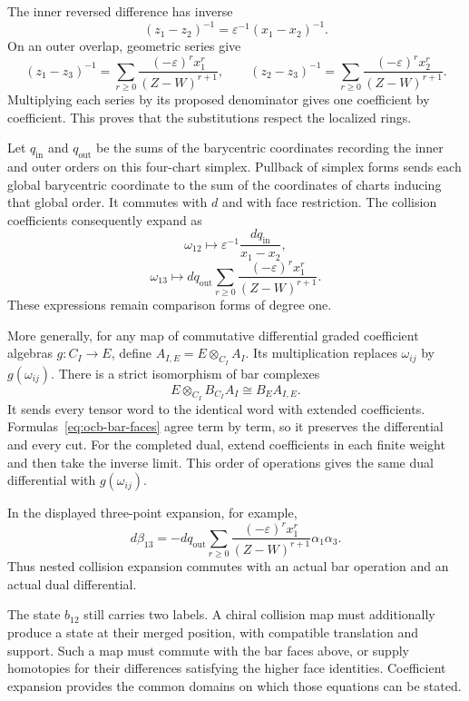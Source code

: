 The inner reversed difference has inverse
\[
 (z_1-z_2)^{-1}
 =\varepsilon^{-1}(x_1-x_2)^{-1}.
\]
On an outer overlap, geometric series give
\[
 (z_1-z_3)^{-1}
 =\sum_{r\ge0}\frac{(-\varepsilon)^r x_1^r}{(Z-W)^{r+1}},
 \qquad
 (z_2-z_3)^{-1}
 =\sum_{r\ge0}\frac{(-\varepsilon)^r x_2^r}{(Z-W)^{r+1}}.
\]
Multiplying each series by its proposed denominator gives one
coefficient by coefficient. This proves that the substitutions
respect the localized rings.

Let $q_{\mathrm{in}}$ and $q_{\mathrm{out}}$ be the sums of the
barycentric coordinates recording the inner and outer orders on
this four-chart simplex. Pullback of simplex forms sends each
global barycentric coordinate to the sum of the coordinates of
charts inducing that global order.
It commutes with $d$ and with face restriction.
The collision coefficients consequently expand as
\[
 \omega_{12}\longmapsto
 \varepsilon^{-1}\frac{dq_{\mathrm{in}}}{x_1-x_2},
\]
\[
 \omega_{13}\longmapsto
 dq_{\mathrm{out}}\sum_{r\ge0}
 \frac{(-\varepsilon)^r x_1^r}{(Z-W)^{r+1}}.
\]
These expressions remain comparison forms of degree one.

More generally, for any map of commutative differential graded
coefficient algebras $g:C_I\to E$, define
$A_{I,E}=E\otimes_{C_I}A_I$.
Its multiplication replaces $\omega_{ij}$ by $g(\omega_{ij})$.
There is a strict isomorphism of bar complexes
\[
 E\otimes_{C_I}B_{C_I}A_I
 \cong B_E A_{I,E}.
\]
It sends every tensor word to the identical word with extended
coefficients. Formulas~\eqref{eq:ocb-bar-faces} agree term by term,
so it preserves the differential and every cut.
For the completed dual, extend coefficients in each finite weight
and then take the inverse limit. This order of operations gives
the same dual differential with $g(\omega_{ij})$.

In the displayed three-point expansion, for example,
\[
 d\beta_{13}
 =-dq_{\mathrm{out}}\sum_{r\ge0}
 \frac{(-\varepsilon)^r x_1^r}{(Z-W)^{r+1}}
 \alpha_1\alpha_3.
\]
Thus nested collision expansion commutes with an actual bar
operation and an actual dual differential.

The state $b_{12}$ still carries two labels.
A chiral collision map must additionally produce a state at their
merged position, with compatible translation and support.
Such a map must commute with the bar faces above, or supply
homotopies for their differences satisfying the higher face
identities. Coefficient expansion provides the common domains on
which those equations can be stated.
